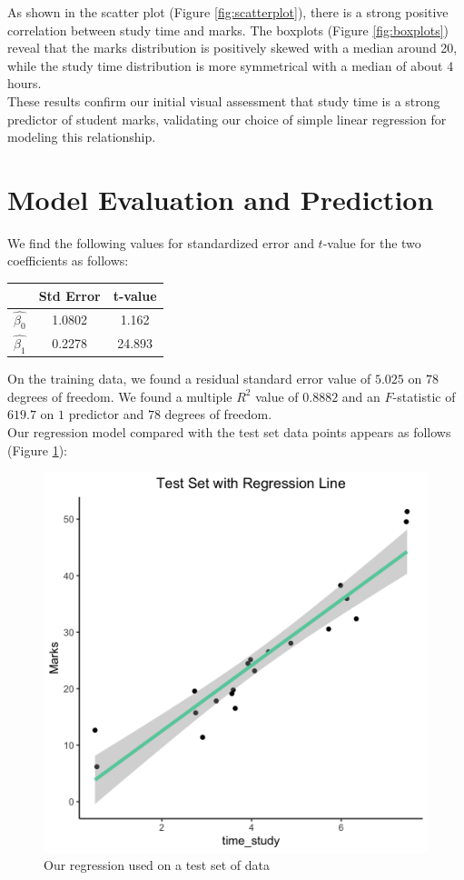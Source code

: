 \documentclass{article}
\begin{document}
\noindent As shown in the scatter plot (Figure \ref{fig:scatterplot}), there is a strong positive correlation between study time and marks. The boxplots (Figure \ref{fig:boxplots}) reveal that the marks distribution is positively skewed with a median around 20, while the study time distribution is more symmetrical with a median of about 4 hours. \\

\noindent These results confirm our initial visual assessment that study time is a strong predictor of student marks, validating our choice of simple linear regression for modeling this relationship.

\section{Model Evaluation and Prediction}
We find the following values for standardized error and $t$-value for the two coefficients as follows:

\begin{center}
  \begin{tabular}{c | c c}
    & Std Error & t-value \\
    \hline
    $\hat{\beta_0}$ & 1.0802 & 1.162 \\
    $\hat{\beta_1}$ & 0.2278 & 24.893
  \end{tabular}
\end{center}

\noindent On the training data, we found a residual standard error value of $5.025$ on $78$ degrees of freedom. We found a multiple $R^2$ value of $0.8882$ and an $F$-statistic of $619.7$ on $1$ predictor and $78$ degrees of freedom. \\

\noindent Our regression model compared with the test set data points appears as follows (Figure \ref{fig:testsSet}):

\begin{figure}[h]
    \includegraphics[width=0.75\linewidth]{imgs/Test_Set_With_Regression_Line.png}
    \caption{Our regression used on a test set of data}
    \label{fig:testsSet}
\end{figure}
\end{document}
